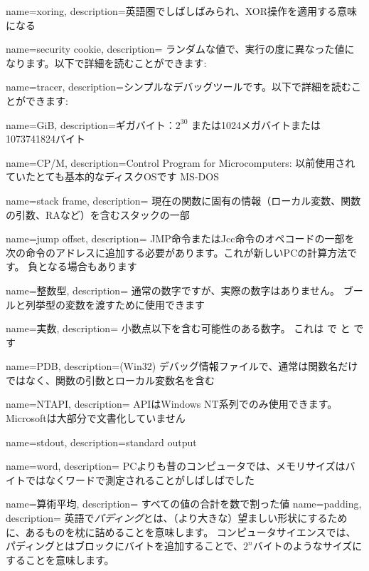 {
  name=xoring,
  description={英語圏でしばしばみられ、\ac{XOR}操作を適用する意味になる}
}

{
  name=security cookie,
  description={
  ランダムな値で、実行の度に異なった値になります。以下で詳細を読むことができます: }
}

{
  name=tracer,
  description={シンプルなデバッグツールです。以下で詳細を読むことができます: }
}

{
  name=GiB,
  description={ギガバイト：$2^{30}$ または1024メガバイトまたは1073741824バイト}
}

{
  name=CP/M,
  description={Control Program for Microcomputers: 以前使用されていたとても基本的なディスク\ac{OS}です MS-DOS}
}

{
  name=stack frame,
  description=
  {現在の関数に固有の情報（ローカル変数、関数の引数、\ac{RA}など）を含むスタックの一部}
}

{
  name=jump offset,
  description=
  {JMP命令またはJcc命令のオペコードの一部を次の命令のアドレスに追加する必要があります。これが新しい\ac{PC}の計算方法です。 負となる場合もあります}
}

{
  name=整数型,
  description=
  {通常の数字ですが、実際の数字はありません。 ブールと列挙型の変数を渡すために使用できます}
}

{
  name=実数,
  description={
  小数点以下を含む可能性のある数字。 これは \CCpp で \Tfloat と \Tdouble です
  }
}

{
  name=PDB,
  description={(Win32) 
  デバッグ情報ファイルで、通常は関数名だけではなく、関数の引数とローカル変数名を含む}
}

{
  name=NTAPI,
  description=
  {APIはWindows NT系列でのみ使用できます。 Microsoftは大部分で文書化していません}
}

{
  name=stdout,
  description={standard output}
}

{
  name=word,
  description=
  {PCよりも昔のコンピュータでは、メモリサイズはバイトではなくワードで測定されることがしばしばでした}
}

{
  name={算術平均},
  description=
  {すべての値の合計を数で割った値}
}
{
  name=padding,
  description=
  {英語で\emph{パディング}とは、（より大きな）望ましい形状にするために、あるものを枕に詰めることを意味します。
  コンピュータサイエンスでは、パディングとはブロックにバイトを追加することで、$2^n$バイトのようなサイズにすることを意味します。}
}

